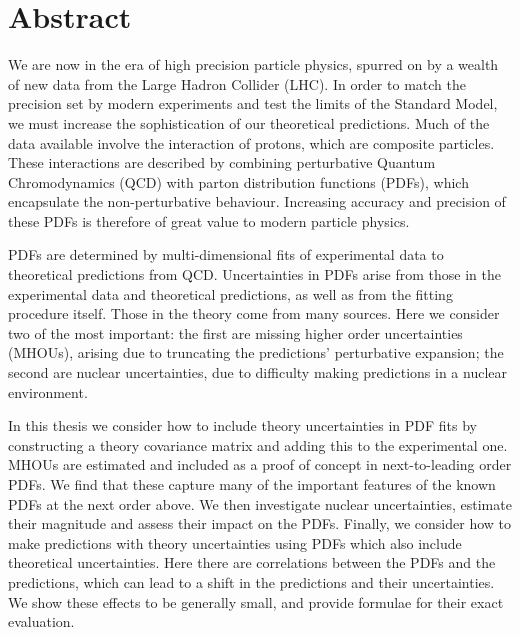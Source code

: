 \chapter{Abstract}
We are now in the era of high precision particle physics, spurred on by a wealth of new data from the Large Hadron Collider (LHC). In order to match the precision set by modern experiments and test the limits of the Standard Model, we must increase the sophistication of our theoretical predictions. Much of the data available involve the interaction of protons, which are composite particles. These interactions are described by combining perturbative Quantum Chromodynamics (QCD) with parton distribution functions (PDFs), which encapsulate the non-perturbative behaviour. Increasing accuracy and precision of these PDFs is therefore of great value to modern particle physics.

PDFs are determined by multi-dimensional fits of experimental data to theoretical predictions from QCD. Uncertainties in PDFs arise from those in the experimental data and theoretical predictions, as well as from the fitting procedure itself. Those in the theory come from many sources. Here we consider two of the most important: the first are missing higher order uncertainties (MHOUs), arising due to truncating the predictions' perturbative expansion; the second are nuclear uncertainties, due to difficulty making predictions in a nuclear environment.

In this thesis we consider how to include theory uncertainties in PDF fits by constructing a theory covariance matrix and adding this to the experimental one. MHOUs are estimated and included as a proof of concept in next-to-leading order PDFs. We find that these capture many of the important features of the known PDFs at the next order above. We then investigate nuclear uncertainties, estimate their magnitude and assess their impact on the PDFs. Finally, we consider how to make predictions with theory uncertainties using PDFs which also include theoretical uncertainties. Here there are correlations between the PDFs and the predictions, which can lead to a shift in the predictions and their uncertainties. We show these effects to be generally small, and provide formulae for their exact evaluation.
